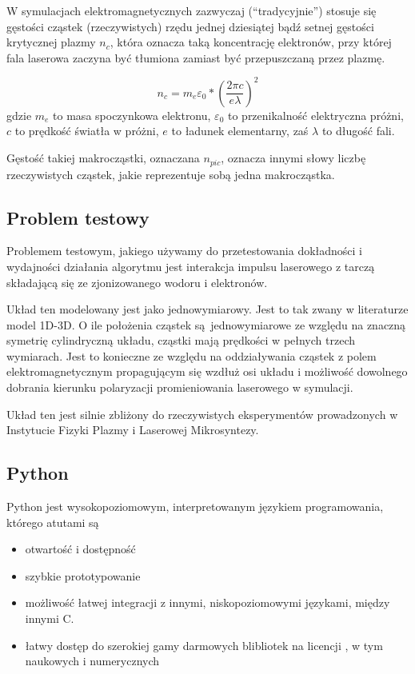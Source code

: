     W symulacjach elektromagnetycznych zazwyczaj (``tradycyjnie'') stosuje się
    gęstości cząstek (rzeczywistych) rzędu jednej dziesiątej bądź setnej
    gęstości krytycznej plazmy $n_c$, która oznacza taką koncentrację
    elektronów, przy której fala laserowa zaczyna być tłumiona zamiast być
    przepuszczaną przez plazmę.  %


    \begin{equation}
        n_c = m_e \varepsilon_0 * {(\frac{2 \pi c}{e \lambda})}^2
        \label{eqn:critical-density}
    \end{equation}
    gdzie $m_e$ to masa spoczynkowa elektronu, $\varepsilon_0$ to przenikalność
    elektryczna próżni, $c$ to prędkość światła w
    próżni, $e$ to ładunek elementarny, zaś $\lambda$ to długość fali.

    Gęstość takiej makrocząstki, oznaczana $n_{pic}$, oznacza innymi słowy
    liczbę rzeczywistych cząstek, jakie reprezentuje sobą jedna makrocząstka.

    \subsection{Problem testowy}

    Problemem testowym, jakiego używamy do przetestowania dokładności i
    wydajności działania algorytmu jest interakcja impulsu laserowego z tarczą
    składającą się ze zjonizowanego wodoru i elektronów.

    Układ ten modelowany jest jako jednowymiarowy. Jest to tak zwany w
    literaturze model 1D-3D.  O ile położenia cząstek są jednowymiarowe ze
    względu na znaczną symetrię cylindryczną układu, cząstki mają prędkości w
    pełnych trzech wymiarach. Jest to konieczne ze względu na oddziaływania
    cząstek z polem elektromagnetycznym propagującym się wzdłuż osi układu
    i możliwość dowolnego dobrania kierunku polaryzacji promieniowania
    laserowego w symulacji.

    Układ ten jest silnie zbliżony do rzeczywistych eksperymentów prowadzonych
    w Instytucie Fizyki Plazmy i Laserowej Mikrosyntezy.  

    \subsection{Python}
    Python jest wysokopoziomowym, interpretowanym językiem programowania,
    którego atutami są
    \begin{itemize}
    \item otwartość i dostępność
    \item szybkie prototypowanie
    \item możliwość łatwej integracji z innymi, niskopoziomowymi językami, między innymi C.
    \item łatwy dostęp do szerokiej gamy darmowych blibliotek na licencji , w tym naukowych i numerycznych
    \end{itemize}

